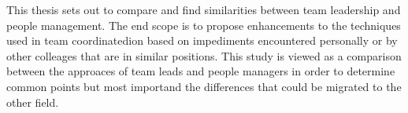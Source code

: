 
This thesis sets out to compare and find similarities between team leadership and people management. The end scope is to propose enhancements to the techniques used in team coordinatedion based on impediments encountered personally or by other colleages that are in similar positions. This study is viewed as a comparison between the approaces of team leads and people managers in order to determine common points but most importand the differences that could be migrated to the other field.
